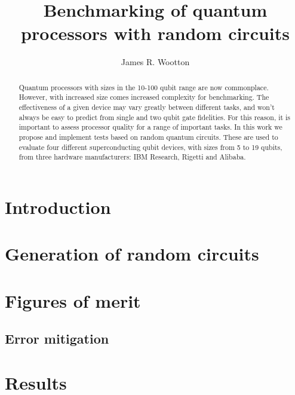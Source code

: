 \documentclass[aps,prl,twocolumn,showpacs,preprintnumbers]{revtex4-1}
\begin{document}
\title{Benchmarking of quantum processors with random circuits}
\author{James R. Wootton}


\begin{abstract}

Quantum processors with sizes in the 10-100 qubit range are now commonplace. However, with increased size comes increased complexity for benchmarking. The effectiveness of a given device may vary greatly between different tasks, and won’t always be  easy to predict from single and two qubit gate fidelities. For this reason, it is important to assess processor quality for a range of important tasks. In this work we propose and implement tests based on random quantum circuits. These are used to evaluate four different superconducting qubit devices, with sizes from 5 to 19 qubits, from three hardware manufacturers: IBM Research, Rigetti and Alibaba.


\end{abstract}


\pacs{}

\maketitle


\section{Introduction}



\section{Generation of random circuits}



\section{Figures of merit}

\subsection{Error mitigation}



\section{Results}
\end{document}
